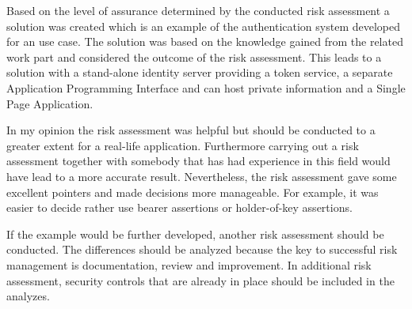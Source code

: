 Based on the level of assurance determined by the conducted risk assessment a solution was created which is an example of the authentication system developed for an use case. The solution was based on the knowledge gained from the related work part and considered the outcome of the risk assessment. This leads to a solution with a stand-alone identity server providing a token service, a separate Application Programming Interface and can host private information and a Single Page Application. 

In my opinion the risk assessment was helpful but should be conducted to a greater extent for a real-life application. Furthermore carrying out a risk assessment together with somebody that has had experience in this field would have lead to a more accurate result. Nevertheless, the risk assessment gave some excellent pointers and made decisions more manageable. For example, it was easier to decide rather use bearer assertions or holder-of-key assertions. 

If the example would be further developed, another risk assessment should be conducted. The differences should be analyzed because the key to successful risk management is documentation, review and improvement. In additional risk assessment, security controls that are already in place should be included in the analyzes.


\chapterend

